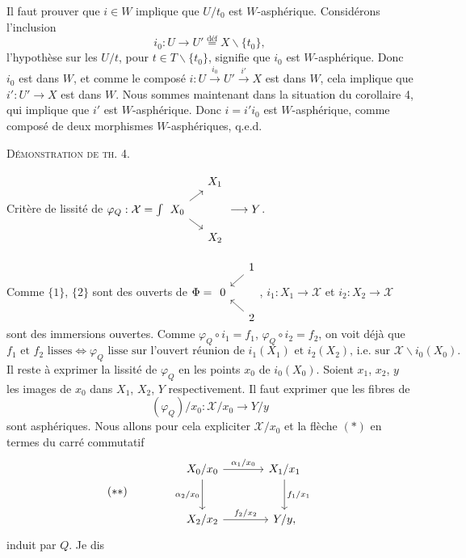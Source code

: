 \documentclass[11pt]{article}
\newcommand{\printedpage}[1]{\marginpar{\footnotesize p.~#1}}
\newcommand{\msp}[1]{\marginpar{\footnotesize [#1]}}
\newcommand{\circled}[1]{\tikz[baseline=(char.base)]{\node[shape=circle,draw,inner sep=1pt] (char) {#1};}}
\newcommand{\intdiag}[3]{\int\begin{tikzcd}[row sep=small,column sep=small,ampersand replacement=\&,baseline=(\tikzcdmatrixname-2-1.base)] \& #2 \\ #1 \arrow[ur]\arrow[dr] \& \\ \& #3 \end{tikzcd}}
\begin{document}
Il faut prouver que $i\in W$ implique que $U/t_0$ est $W$-asphérique. Considérons l'inclusion
\[
i_0 : U\longrightarrow U' \overset{\text{déf}}{=} X\backslash\{t_0\},
\]
l'hypothèse sur les $U/t$, pour $t\in T\backslash\{t_0\}$, signifie que $i_0$ est $W$-asphérique. Donc $i_0$ est dans $W$, et comme le composé $i : U\xrightarrow{i_0} U'\xrightarrow{i'} X$ est dans $W$, cela implique que
\printedpage{104}
$i' : U'\longrightarrow X$ est dans $W$. Nous sommes maintenant dans la situation du corollaire 4, qui implique que $i'$ est $W$-asphérique. Donc $i=i'i_0$ est $W$-asphérique, comme composé de deux morphismes $W$-asphériques, q.e.d.

\noindent\textsc{Démonstration de th. 4.}

\noindent\circled{a} Critère de lissité de $\varphi_Q : \mathcal{X} = \intdiag{X_0}{X_1}{X_2} \longrightarrow Y$.

Comme $\{1\}$, $\{2\}$ sont des ouverts de $\Phi = \begin{tikzcd}[row sep=small,column sep=small,baseline=(\tikzcdmatrixname-2-1.base)]
 & 1 \arrow[dl] \\
 0 & \\
 & 2 \arrow[ul]
\end{tikzcd}$, $i_1 : X_1\longrightarrow\mathcal{X}$ et $i_2 : X_2\longrightarrow\mathcal{X}$ sont des immersions ouvertes. Comme $\varphi_Q\circ i_1 = f_1$,
\msp{page 152}
$\varphi_Q\circ i_2=f_2$, on voit déjà que
\[
f_1 \text{ et } f_2 \text{ lisses} \iff \varphi_Q \text{ lisse sur l'ouvert réunion de } i_1(X_1) \text{ et } i_2(X_2)\text{, i.e. sur } \mathcal{X}\backslash i_0(X_0).
\]
Il reste à exprimer la lissité de $\varphi_Q$ en les points $x_0$ de $i_0(X_0)$. Soient $x_1$, $x_2$, $y$ les images de $x_0$ dans $X_1$, $X_2$, $Y$ respectivement. Il faut exprimer que les fibres de
\[
(\varphi_Q)/x_0 : \mathcal{X}/x_0\longrightarrow Y/y \tag*{$(*)$}
\]
sont asphériques. Nous allons pour cela expliciter $\mathcal{X}/x_0$ et la flèche $(*)$ en termes du carré commutatif
\[
(**)\qquad\qquad
\begin{tikzcd}[row sep=large,column sep=large]
X_0/x_0 \arrow[r, "\alpha_1/x_0"] \arrow[d, "\alpha_2/x_0"'] & X_1/x_1 \arrow[d, "f_1/x_1"] \\
X_2/x_2 \arrow[r, "f_2/x_2"] & Y/y,
\end{tikzcd}
\]
induit par $Q$. Je dis
\end{document}

